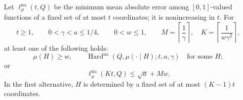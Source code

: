\begin{proposition}
\label{ian:nonadaptive-hard-sector-regularity}
Let \(\ell_\mu^{\mathrm{na}}(t,Q)\) be the minimum mean absolute
error among \([0,1]\)-valued functions of a fixed set of at most
\(t\) coordinates; it is nonincreasing in \(t\). For
\[
 t\ge1,\qquad 0<\gamma<a\le1/4,\qquad 0<w\le1,
 \qquad
 M=\left\lceil\frac1\gamma\right\rceil,\quad
 K=\left\lceil\frac1{w\gamma^2}\right\rceil,
\]
at least one of the following holds:
\[
 \mu(H)\ge w,\qquad
 \operatorname{Hard}^{\mathrm{na}}
 (Q,\mu(\cdot\mid H);t,a,\gamma)
 \quad\text{for some }H;
\]
or
\[
 \ell_\mu^{\mathrm{na}}(Kt,Q)\le\sqrt a+Mw.
\]
In the first alternative, \(H\) is determined by a fixed set of at
most \((K-1)t\) coordinates.
\end{proposition}

